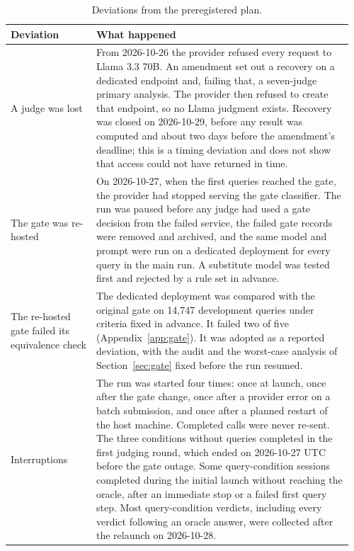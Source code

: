 \begin{table}[h]
\centering
\caption{Deviations from the preregistered plan.}
\label{tab:deviations}
\small
\begin{tabular}{@{}p{0.24\linewidth}p{0.72\linewidth}@{}}
\toprule
Deviation & What happened \\
\midrule
A judge was lost &
From 2026-10-26 the provider refused every request to Llama 3.3 70B. An amendment set out a recovery on a dedicated
endpoint and, failing that, a seven-judge primary analysis. The provider then refused to create that endpoint, so no
Llama judgment exists. Recovery was closed on 2026-10-29, before any result was computed and about two days before
the amendment's deadline; this is a timing deviation and does not show that access could not have returned in
time. \\
\addlinespace
The gate was re-hosted &
On 2026-10-27, when the first queries reached the gate, the provider had stopped serving the gate classifier. The run
was paused before any judge had used a gate decision from the failed service, the failed gate records were removed
and archived, and the same model and prompt were run on a dedicated deployment for every query in the main run. A
substitute model was tested first and rejected by a rule set in advance. \\
\addlinespace
The re-hosted gate failed its equivalence check &
The dedicated deployment was compared with the original gate on 14,747 development queries under criteria fixed in
advance. It failed two of five (Appendix~\ref{app:gate}). It was adopted as a reported deviation, with the audit and
the worst-case analysis of Section~\ref{sec:gate} fixed before the run resumed. \\
\addlinespace
Interruptions &
The run was started four times: once at launch, once after the gate change, once after a provider error on a batch
submission, and once after a planned restart of the host machine. Completed calls were never re-sent. The three
conditions without queries completed in the first judging round, which ended on 2026-10-27 UTC before the gate
outage. Some query-condition sessions completed during the initial launch without reaching the oracle, after an
immediate stop or a failed first query step. Most
query-condition verdicts, including every verdict following an oracle answer, were collected after the relaunch on
2026-10-28. \\
\bottomrule
\end{tabular}
\end{table}

